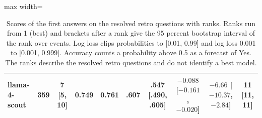 \begin{table}[t]
\begin{adjustbox}{max width=\linewidth}
\begin{tabular}{lrcccccccc}
llama-4-scout & 359 & 7 [5, 10] & 0.749 & 0.761 & .607 & .547 [.490, .605] & $-0.088$ [$-0.161$, $-0.020$] & $-6.66$ [$-10.37$, $-2.84$] & 11 [11, 11] \\
\bottomrule
\end{tabular}
\end{adjustbox}
\caption{Scores of the first answers on the resolved retro questions with ranks. Ranks run from 1 (best) and brackets after a rank give the 95 percent bootstrap interval of the rank over events. Log loss clips probabilities to [0.01, 0.99] and log loss 0.001 to [0.001, 0.999]. Accuracy counts a probability above 0.5 as a forecast of Yes. The ranks describe the resolved retro questions and do not identify a best model.}
\label{tab:scores}
\end{table}
